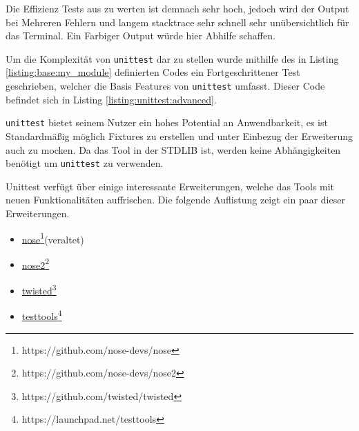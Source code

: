 Die Effizienz Tests aus zu werten ist demnach sehr hoch, jedoch wird der Output
bei Mehreren Fehlern und langem \gls{stacktrace} sehr schnell sehr
unübersichtlich für das Terminal. Ein Farbiger Output würde hier Abhilfe
schaffen.

Um die Komplexität von \lstinline{unittest} dar zu stellen wurde mithilfe des in Listing \ref{listing:base:my_module} definierten Codes ein Fortgeschrittener Test
geschrieben, welcher die Basis Features von \lstinline{unittest} umfasst. Dieser Code
befindet sich in Listing \ref{listing:unittest:advanced}.

\lstinline{unittest} bietet seinem Nutzer ein hohes Potential an Anwendbarkeit,
es ist Standardmäßig möglich Fixtures zu erstellen und unter Einbezug der
Erweiterung auch zu mocken. Da das Tool in der STDLIB ist, werden keine
Abhängigkeiten benötigt um \lstinline{unittest} zu verwenden.

Unittest verfügt über einige interessante Erweiterungen, welche das Tools mit neuen Funktionalitäten auffrischen.
Die folgende Auflistung zeigt ein paar dieser Erweiterungen.
\begin{itemize}
    \item \href{https://github.com/nose-devs/nose}{nose}\footnote{https://github.com/nose-devs/nose}(veraltet)
    \item \href{https://github.com/nose-devs/nose2}{nose2}\footnote{https://github.com/nose-devs/nose2}
    \item \href{https://github.com/twisted/twisted}{twisted}\footnote{https://github.com/twisted/twisted}
    \item \href{https://launchpad.net/testtools}{testtools}\footnote{https://launchpad.net/testtools}
\end{itemize}
